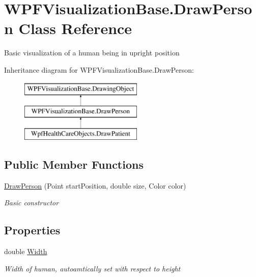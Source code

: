 \hypertarget{class_w_p_f_visualization_base_1_1_draw_person}{}\section{W\+P\+F\+Visualization\+Base.\+Draw\+Person Class Reference}
\label{class_w_p_f_visualization_base_1_1_draw_person}


Basic visualization of a human being in upright position  


Inheritance diagram for W\+P\+F\+Visualization\+Base.\+Draw\+Person\+:\begin{figure}[H]
\begin{center}
\leavevmode
\includegraphics[height=3.000000cm]{class_w_p_f_visualization_base_1_1_draw_person}
\end{center}
\end{figure}
\subsection*{Public Member Functions}
\begin{DoxyCompactItemize}
\item 
\hyperlink{class_w_p_f_visualization_base_1_1_draw_person_a01d7113d8c278beec4e6d9956f552704}{Draw\+Person} (Point start\+Position, double size, Color color)
\begin{DoxyCompactList}\small\item\em Basic constructor \end{DoxyCompactList}\end{DoxyCompactItemize}
\subsection*{Properties}
\begin{DoxyCompactItemize}
\item 
double \hyperlink{class_w_p_f_visualization_base_1_1_draw_person_a46f8257fc07d8d07d82de5c2be0b0e98}{Width}
\begin{DoxyCompactList}\small\item\em Width of human, autoamtically set with respect to height \end{DoxyCompactList}\end{DoxyCompactItemize}
